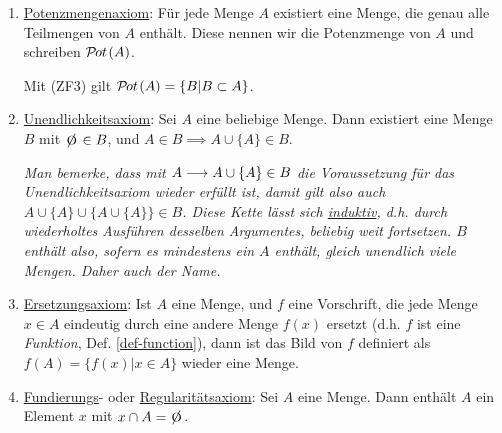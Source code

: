 \begin{axiom}
\begin{enumerate}[label=(ZF\arabic*)]
        Formal ist die Aussage $\exists \e: \forall x: x \notin \e$.

        Eine Menge $A \neq \e$ nennen wir \underline{nichtleer}.
        \item \underline{Potenzmengenaxiom}: Für jede Menge $A$ existiert eine Menge, die genau alle Teilmengen von $A$ enthält. Diese nennen wir die Potenzmenge von $A$ und schreiben $\mathcal{P}\hspace{-1pt}ot\hspace{1pt}(A)$.
        
        Mit (ZF3) gilt $\mathcal{P}\hspace{-1pt}ot\hspace{1pt}(A) = \{B | B \subset A\}$.
        \item \underline{Unendlichkeitsaxiom}: Sei $A$ eine beliebige Menge. Dann existiert eine Menge $B$ mit $\e \in B$, und $A \in B \implies A \cup \{A\} \in B$.

        \emph{Man bemerke, dass mit $A \longrightarrow A \cup \{A\} \in B$ die Voraussetzung für das Unendlichkeitsaxiom wieder erfüllt ist, damit gilt also auch $A \cup \{A\} \cup \{A \cup \{A\}\} \in B$. Diese Kette lässt sich \underline{induktiv}, d.h. durch wiederholtes Ausführen desselben Argumentes, beliebig weit fortsetzen. $B$ enthält also, sofern es mindestens ein $A$ enthält, gleich unendlich viele Mengen. Daher auch der Name.}
        \item \underline{Ersetzungsaxiom}: Ist $A$ eine Menge, und $f$ eine Vorschrift, die jede Menge $x \in A$ eindeutig durch eine andere Menge $f(x)$ ersetzt (d.h. $f$ ist eine \emph{Funktion}, Def. \ref{def-function}), dann ist das Bild von $f$ definiert als $f(A) = \{f(x) | x \in A\}$ wieder eine Menge.
        \item \underline{Fundierungs}- oder \underline{Regularitätsaxiom}: Sei $A$ eine Menge. Dann enthält $A$ ein Element $x$ mit $x \cap A = \e$.
    \end{enumerate}
\end{axiom}

